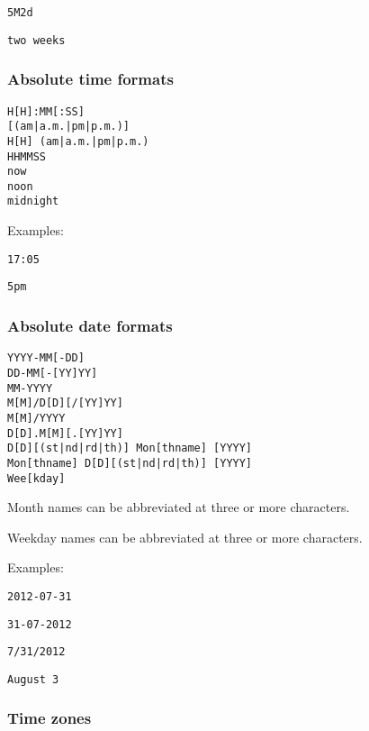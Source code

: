 \documentclass[a4,onecolumn,portrait]{article}
\begin{document}
\begin{verbatim}
5M2d
\end{verbatim}

\begin{verbatim}
two weeks
\end{verbatim}
\subsubsection{Absolute time formats}
\label{sec-7-3-3}

\begin{verbatim}
H[H]:MM[:SS]
[(am|a.m.|pm|p.m.)]
H[H] (am|a.m.|pm|p.m.)
HHMMSS
now
noon
midnight
\end{verbatim}

Examples:

\begin{verbatim}
17:05
\end{verbatim}

\begin{verbatim}
5pm
\end{verbatim}
\subsubsection{Absolute date formats}
\label{sec-7-3-4}

\begin{verbatim}
YYYY-MM[-DD]
DD-MM[-[YY]YY]
MM-YYYY
M[M]/D[D][/[YY]YY]
M[M]/YYYY
D[D].M[M][.[YY]YY]
D[D][(st|nd|rd|th)] Mon[thname] [YYYY]
Mon[thname] D[D][(st|nd|rd|th)] [YYYY]
Wee[kday]
\end{verbatim}

Month names can be abbreviated at three or more characters.

Weekday names can be abbreviated at three or more characters.

Examples:

\begin{verbatim}
2012-07-31
\end{verbatim}

\begin{verbatim}
31-07-2012
\end{verbatim}

\begin{verbatim}
7/31/2012
\end{verbatim}

\begin{verbatim}
August 3
\end{verbatim}
\subsubsection{Time zones}
\label{sec-7-3-5}
\end{document}
